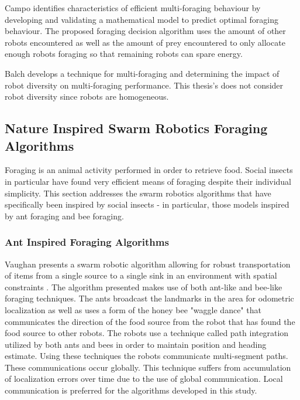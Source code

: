 \begin{itemize}
Campo \cite{campo2007efficient} identifies characteristics of efficient multi-foraging behaviour by developing and validating a mathematical model to predict optimal foraging behaviour. The proposed foraging decision algorithm uses the amount of other robots encountered as well as the amount of prey encountered to only allocate enough robots foraging  so that remaining robots can spare energy.

Balch \cite{balch1999impact} develops a technique for multi-foraging and determining the impact of robot diversity on multi-foraging performance. This thesis's does not consider robot diversity since robots are homogeneous.

\end{itemize}



\subsection{Nature Inspired Swarm Robotics Foraging Algorithms}

Foraging is an animal activity performed in order to retrieve food. Social insects in particular have found very efficient means of foraging despite their individual simplicity. This section addresses the swarm robotics algorithms that have specifically been inspired by social insects - in particular, those models inspired by ant foraging and bee foraging. 


\subsubsection{Ant Inspired Foraging Algorithms}
\label{sec:second:natureinspired:ant}

Vaughan presents a swarm robotic algorithm allowing for robust transportation of items from a single source to a single sink in an environment with spatial constraints \cite{vaughan2000blazing}. The algorithm presented makes use of both ant-like and bee-like foraging techniques. The ants broadcast the landmarks in the area for odometric localization as well as uses a form of the  honey bee "waggle dance" that communicates the direction of the food source from the robot that has found the food source to other robots. The robots use a technique called path integration utilized by both ants and bees in order to maintain position and heading estimate. Using these techniques the robots communicate multi-segment paths. These communications occur globally. This technique suffers from accumulation of localization errors over time due to the use of global communication. Local communication is preferred for the algorithms developed in this study.

